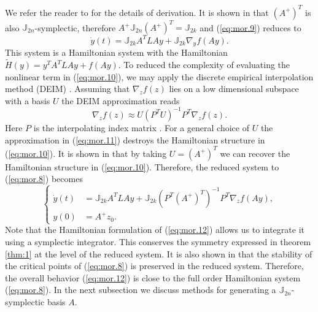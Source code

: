 We refer the reader to \cite{doi:10.1137/17M1111991} for the details of derivation. It is shown in \cite{doi:10.1137/140978922} that $(A^+)^T$ is also $\mathbb J_{2n}$-symplectic, therefore $A^+ \mathbb J_{2n} (A^+)^T = \mathbb J_{2k}$ and (\ref{eq:mor.9}) reduces to
\begin{equation} \label{eq:mor.10}
	\dot y(t) = \mathbb J_{2k} A^T L A y + \mathbb J_{2k} \nabla_y f(Ay).
\end{equation}
This system is a Hamiltonian system with the Hamiltonian $\tilde H(y) = y^T A^T L A y + f(Ay)$. To reduced the complexity of evaluating the nonlinear term in (\ref{eq:mor.10}), we may apply the discrete empirical interpolation method (DEIM) \cite{barrault2004empirical,Chaturantabut:2010cz}. Assuming that $\nabla_z f(z)$ lies on a low dimensional subspace with a basis $U$ the DEIM approximation reads
\begin{equation} \label{eq:mor.11}
	\nabla_z f(z) \approx U (P^T U)^{-1} P^T \nabla_z f(z).
\end{equation}
Here $P$  is the interpolating index matrix \cite{Chaturantabut:2010cz}. For a general choice of $U$ the approximation in (\ref{eq:mor.11}) destroys the Hamiltonian structure in (\ref{eq:mor.10}). It is shown in \cite{doi:10.1137/17M1111991} that by taking $U = (A^+)^T$ we can recover the Hamiltonian structure in (\ref{eq:mor.10}). Therefore, the reduced system to (\ref{eq:mor.8}) becomes
\begin{equation} \label{eq:mor.12}
\left\{
\begin{aligned}
	\dot y(t) &= \mathbb J_{2k} A^T L A y + \mathbb J_{2k} (P^T (A^+)^T)^{-1} P^T \nabla_z f(Ay), \\
	y(0) &= A^+ z_0.
\end{aligned}
\right.
\end{equation}
Note that the Hamiltonian formulation of (\ref{eq:mor.12}) allows us to integrate it using a symplectic integrator. This conserves the symmetry expressed in theorem \ref{thm:1} at the level of the reduced system. It is also shown in \cite{doi:10.1137/17M1111991,doi:10.1137/140978922} that the stability of the critical points of (\ref{eq:mor.8}) is preserved in the reduced system.  Therefore, the overall behavior (\ref{eq:mor.12}) is close to the full order Hamiltonian system (\ref{eq:mor.8}). In the next subsection we discuss methods for generating a $\mathbb J_{2n}$-symplectic basis $A$.

